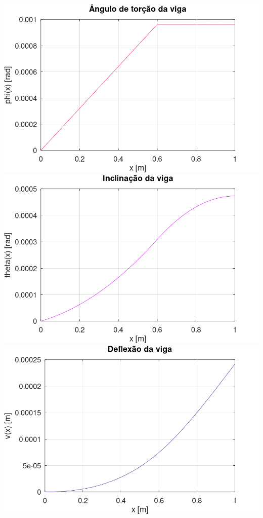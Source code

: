 \documentclass[10pt]{article}
\begin{document}
\begin{center}
    \includegraphics[scale=0.25]{figure6.png}
    \includegraphics[scale=0.25]{figure7.png}
    \includegraphics[scale=0.25]{figure8.png}

\end{center}
\end{document}

